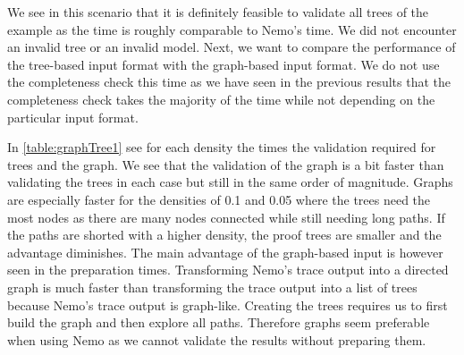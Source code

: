 We see in this scenario that it is definitely feasible to validate all trees of the example as the time is roughly comparable to Nemo's time. We did not encounter an invalid tree or an invalid model. Next, we want to compare the performance of the tree-based input format with the graph-based input format. We do not use the completeness check this time as we have seen in the previous results that the completeness check takes the majority of the time while not depending on the particular input format.

In \cref{table:graphTree1} see for each density the times the validation required for trees and the graph. We see that the validation of the graph is a bit faster than validating the trees in each case but still in the same order of magnitude. Graphs are especially faster for the densities of 0.1 and 0.05 where the trees need the most nodes as there are many nodes connected while still needing long paths. If the paths are shorted with a higher density, the proof trees are smaller and the advantage diminishes. The main advantage of the graph-based input is however seen in the preparation times. Transforming Nemo's trace output into a directed graph is much faster than transforming the trace output into a list of trees because Nemo's trace output is graph-like. Creating the trees requires us to first build the graph and then explore all paths. Therefore graphs seem preferable when using Nemo as we cannot validate the results without preparing them.

